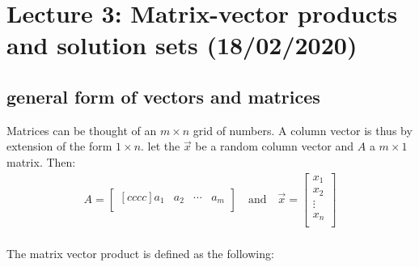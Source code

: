 \documentclass[11pt, a4paper]{article}
\begin{document}
\setcounter{section}{2}
\section{Lecture 3: Matrix-vector products and solution sets (18/02/2020)}

\subsection{general form of vectors and matrices}
Matrices can be thought of an $m \times n$ grid of numbers. A column vector is thus by extension
of the form $1 \times n$. let the $\vec{x}$ be a random column vector and $A$ a $m \times 1$ matrix.  
Then: 
\begin{align*}
  A = 
  \begin{bmatrix}[cccc]
    a_1 & a_2 & \cdots & a_m\\
  \end{bmatrix}
  \quad \text{and} \quad 
  \vec{x} = 
  \begin{bmatrix}
    x_1\\
    x_2\\
    \vdots \\
    x_n\\
  \end{bmatrix}
\end{align*}
\\
The matrix vector product is defined as the following:
\end{document}

